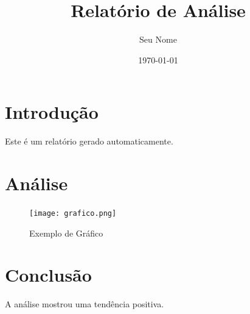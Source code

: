 \documentclass{article}
\title{Relatório de Análise}
\author{Seu Nome}
\date{\today}
\begin{document}
\maketitle

\section{Introdução}
Este é um relatório gerado automaticamente.

\section{Análise}

\begin{figure}[h!]
    \centering
    \texttt{[image: grafico.png]}
    \caption{Exemplo de Gráfico}
\end{figure}

\section{Conclusão}
A análise mostrou uma tendência positiva.
\end{document}
